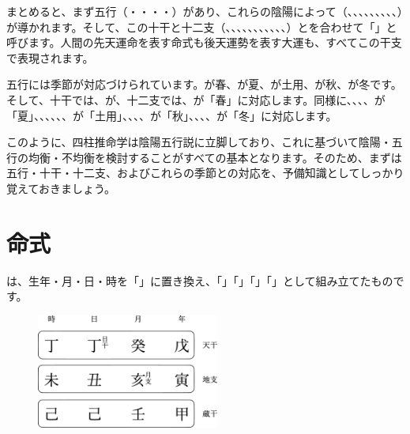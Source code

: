 \documentclass[a5paper,11pt,dvipdfmx]{tarticle}
\begin{document}
まとめると、まず五行（・・・・）があり、これらの陰陽によって（、、、、、、、、、）が導かれます。そして、この十干と十二支（、、、、、、、、、、、）とを合わせて「」と呼びます。人間の先天運命を表す命式も後天運勢を表す大運も、すべてこの干支で表現されます。

五行には季節が対応づけられています。が春、が夏、が土用、が秋、が冬です。そして、十干では、が、十二支では、が「春」に対応します。同様に、、、、が「夏」、、、、、、が「土用」、、、、が「秋」、、、、が「冬」に対応します。

このように、四柱推命学は陰陽五行説に立脚しており、これに基づいて陰陽・五行の均衡・不均衡を検討することがすべての基本となります。そのため、まずは五行・十干・十二支、およびこれらの季節との対応を、予備知識としてしっかり覚えておきましょう。


\clearpage

\section{命式}

は、生年・月・日・時を「」に置き換え、「」「」「」「」として組み立てたものです。

\begin{figure}
  \includegraphics[width=60mm,angle=90]{figs/figure3-1.eps}
\end{figure}
\end{document}
